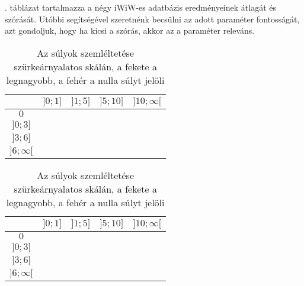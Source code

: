 \documentclass[12pt]{article}
\begin{document}
. táblázat tartalmazza a négy iWiW-es adatbázis eredményeinek átlagát és szórását. Utóbbi segítségével szeretnénk becsülni az adott paraméter fontosságát, azt gondoljuk, hogy ha kicsi a szórás, akkor az a paraméter releváns.
\begin{table}[H]
	\centering
	\begin{subtable}{0.49\linewidth}
		\centering
		\captionsetup{justification=centering}
		\begin{tabular}{|c|c|c|c|c|}
			\hline
			\diagbox[width=1.5cm,height=1.2cm]{$\sigma_{cs}$}{$n_{cs}$} & $]0;1]$ & $]1;5]$ & $]5;10]$ & $]10;\infty[$  \\
			\hline
			$0$ & \cellcolor{black!2.29197724866} & \multicolumn{3}{|c|}{\cellcolor{black!61.6417959552}} \\
			\hline
			$]0;3]$ & \multicolumn{2}{|c|}{\cellcolor{black!32.1530429639}} & \cellcolor{black!100.0} & \cellcolor{black!74.7656558385} \\
			\hline
			$]3;6]$ & \multicolumn{2}{|c|}{\cellcolor{black!7.31710097424}} & \cellcolor{black!14.5082036667} & \cellcolor{black!61.1413096658} \\
			\hline
			$]6;\infty[$  & \multicolumn{2}{|c|}{\cellcolor{black!13.8980750161}} & \cellcolor{black!7.25697267743} & \cellcolor{black!2.50153620463} \\
			\hline
		\end{tabular}
		\caption{Átlagolt eredmény iWiW-es adatok}
	\end{subtable}
	\begin{subtable}{0.49\linewidth}
		\centering
		\captionsetup{justification=centering}
		\begin{tabular}{|c|c|c|c|c|}
			\hline
			\diagbox[width=1.5cm,height=1.2cm]{$\sigma_{cs}$}{$n_{cs}$} & $]0;1]$ & $]1;5]$ & $]5;10]$ & $]10;\infty[$  \\
			\hline
			$0$ & \cellcolor{black!41.6260287747} & \multicolumn{3}{|c|}{\cellcolor{black!100.0}} \\
			\hline
			$]0;3]$ & \multicolumn{2}{|c|}{\cellcolor{black!79.4296340811}} & \cellcolor{black!43.3702665881} & \cellcolor{black!72.2570330425} \\
			\hline
			$]3;6]$ & \multicolumn{2}{|c|}{\cellcolor{black!41.2383548732}} & \cellcolor{black!73.260837667} & \cellcolor{black!13.1102073008} \\
			\hline
			$]6;\infty[$  & \multicolumn{2}{|c|}{\cellcolor{black!0.0}} & \cellcolor{black!14.8125274065} & \cellcolor{black!0.0} \\
			\hline
		\end{tabular}
		\caption{Telefonos adatok 60-69}
	\end{subtable}
	\caption{Az súlyok szemléltetése szürkeárnyalatos skálán, a fekete a legnagyobb, a fehér a nulla súlyt jelöli}
	\label{suly_szemleltetes}
\end{table}
\end{document}
